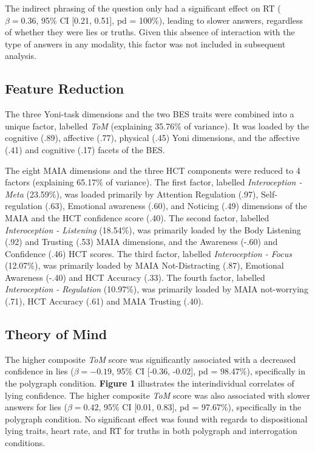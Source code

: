 \documentclass[
  man,mask,floatsintext]{apa6}
\begin{document}
The indirect phrasing of the question only had a significant effect on RT (\(\beta=0.36\), 95\% CI {[}0.21, 0.51{]}, pd = 100\%), leading to slower answers, regardless of whether they were lies or truths. Given this absence of interaction with the type of answers in any modality, this factor was not included in subsequent analysis.

\subsection{Feature Reduction}\label{feature-reduction}

The three Yoni-task dimensions and the two BES traits were combined into a unique factor, labelled \emph{ToM} (explaining 35.76\% of variance). It was loaded by the cognitive (.89), affective (.77), physical (.45) Yoni dimensions, and the affective (.41) and cognitive (.17) facets of the BES.

The eight MAIA dimensions and the three HCT components were reduced to 4 factors (explaining 65.17\% of variance). The first factor, labelled \emph{Interoception - Meta} (23.59\%), was loaded primarily by Attention Regulation (.97), Self-regulation (.63), Emotional awareness (.60), and Noticing (.49) dimensions of the MAIA and the HCT confidence score (.40). The second factor, labelled \emph{Interoception - Listening} (18.54\%), was primarily loaded by the Body Listening (.92) and Trusting (.53) MAIA dimensions, and the Awareness (-.60) and Confidence (.46) HCT scores. The third factor, labelled \emph{Interoception - Focus} (12.07\%), was primarily loaded by MAIA Not-Distracting (.87), Emotional Awareness (-.40) and HCT Accuracy (.33). The fourth factor, labelled \emph{Interoception - Regulation} (10.97\%), was primarily loaded by MAIA not-worrying (.71), HCT Accuracy (.61) and MAIA Trusting (.40).

\subsection{Theory of Mind}\label{theory-of-mind}

The higher composite \emph{ToM} score was significantly associated with a decreased confidence in lies (\(\beta=-0.19\), 95\% CI {[}-0.36, -0.02{]}, pd = 98.47\%), specifically in the polygraph condition. \textbf{Figure 1} illustrates the interindividual correlates of lying confidence. The higher composite \emph{ToM} score was also associated with slower answers for lies (\(\beta=0.42\), 95\% CI {[}0.01, 0.83{]}, pd = 97.67\%), specifically in the polygraph condition. No significant effect was found with regards to dispositional lying traits, heart rate, and RT for truths in both polygraph and interrogation conditions.
\end{document}
